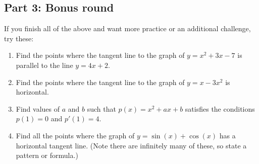 \documentclass[11pt]{article}
\begin{document}
\subsection*{Part 3: Bonus round}

If you finish all of the above and want more practice or an additional challenge, try these: 
\begin{enumerate}
    \item Find the points where the tangent line to the graph of $y = x^2 + 3x - 7$ is parallel to the line $y = 4x + 2$. 
    \item Find the points where the tangent line to the graph of $y = x - 3x^2$ is horizontal. 
    \item Find values of $a$ and $b$ such that $p(x) = x^2 + ax + b$ satisfies the conditions $p(1) = 0$ and $p'(1) = 4$.
    \item Find all the points where the graph of $y = \sin(x) + \cos(x)$ has a horizontal tangent line. (Note there are infinitely many of these, so state a pattern or formula.) 
\end{enumerate}
\end{document}
